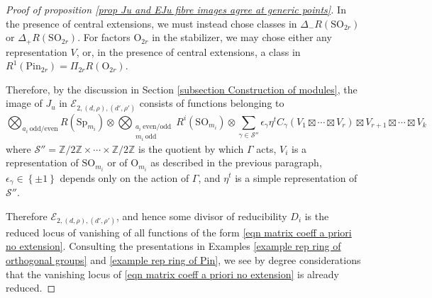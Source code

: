 \documentclass[10pt]{article}
\newcommand{\sett}[1]{\left\{#1\right\}}
\newcommand{\Ee}{\mathcal{E}}
\newcommand{\Z}{\mathbb{Z}}
\newcommand{\SO}{\mathrm{SO}}
\newcommand{\Sp}{\mathrm{Sp}}
\newcommand{\OO}{\mathrm{O}}
\theoremstyle{definition}
\theoremstyle{remark}
\begin{document}
\begin{proof}[Proof of proposition \ref{prop Ju and EJu fibre images agree at generic points}]
In the presence of central extensions, we must instead chose classes in  
$\Delta_{-}R(\SO_{2r})$ or $\Delta_+R(\SO_{2r})$. For factors $\OO_{2r}$ in the stabilizer, 
we may chose either any representation $V$, or, in the presence of central extensions, a class in 
$R^1(\mathrm{Pin}_{2r})=\Pi_{2r} R(\OO_{2r})$. 

Therefore, by the discussion in Section \ref{subsection Construction of modules}, the image of $J_u$ in 
$\Ee_{2,(d,\rho),(d',\rho')}$ consists of functions belonging to
%
\begin{equation}
\label{eqn matrix coeff a priori no extension}
\bigotimes_{a_i~\text{odd/even}}R(\Sp_{m_i})\otimes\bigotimes_{\substack{a_i~\text{even/odd} \\ m_i~\text{odd}}}R^i(\SO_{m_i})\otimes
\sum_{\gamma\in\mathcal{S}''}\epsilon_\gamma\eta^t C_{\gamma}\left(V_1\boxtimes\cdots\boxtimes V_r\right)\boxtimes V_{r+1}\boxtimes\cdots\boxtimes V_{k}
\end{equation}
%
where $\mathcal{S}''=\Z/2\Z\times\cdots\times\Z/2\Z$ is the quotient by which $\Gamma$ acts,
$V_i$ is a representation of $\SO_{m_i}$ or of $\OO_{m_i}$ as described in the previous paragraph, 
$\epsilon_\gamma\in\sett{\pm 1}$ depends only on the action of $\Gamma$, and $\eta^t$ is a simple 
representation of $\mathcal{S}''$. 

Therefore $\Ee_{2,(d,\rho),(d',\rho')}$, and hence some divisor of reducibility $D_i$ is the reduced locus of
vanishing of all functions of the form \eqref{eqn matrix coeff a priori no extension}. Consulting
the presentations in Examples \ref{example rep ring of orthogonal groups} and \ref{example rep ring of Pin}, 
we see by degree considerations that the vanishing locus of \eqref{eqn matrix coeff a priori no extension}
is already reduced.



\end{proof}
\end{document}
